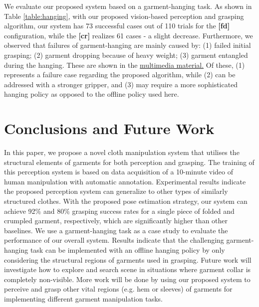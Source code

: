 \documentclass[letterpaper, 10 pt, conference]{ieeeconf}  %
\begin{document}
We evaluate our proposed system based on a garment-hanging task.
As shown in Table \ref{table:hanging}, with our proposed vision-based perception and grasping algorithm, our system has 73 successful cases out of 110 trials for the \textbf{[fd]} configuration, while the \textbf{[cr]} realizes 61 cases - a slight decrease. %
Furthermore, we observed that failures of garment-hanging are mainly caused by: (1) failed initial grasping; (2) garment dropping because of heavy weight; (3) garment entangled during the hanging. These are shown in the \href{https://sites.google.com/view/garment-hanging}{multimedia material.} Of these, (1) represents a failure case regarding the proposed algorithm, while (2) can be addressed with a stronger gripper, and (3) may require a more sophisticated hanging policy as opposed to the offline policy used here.

\section{Conclusions and Future Work}

In this paper, we propose a novel cloth manipulation system that utilises the structural elements of garments for both perception and grasping. The training of this perception system is based on data acquisition of a 10-minute video of human manipulation with automatic annotation. Experimental results indicate the proposed perception system can generalize to other types of similarly structured clothes. With the proposed pose estimation strategy, our system can achieve 92\% and 80\% grasping success rates for a single piece of folded and crumpled garment, respectively, which are significantly higher than other baselines. We use a garment-hanging task as a case study to evaluate the performance of our overall system. Results indicate that the challenging garment-hanging task can be implemented with an offline hanging policy by only considering the structural regions of garments used in grasping.
Future work will investigate how to explore and search scene in situations where garment collar is completely non-visible. More work will be done by using our proposed system to perceive and grasp other vital regions (e.g. hem or sleeves) of garments for implementing different garment manipulation tasks.
\end{document}
